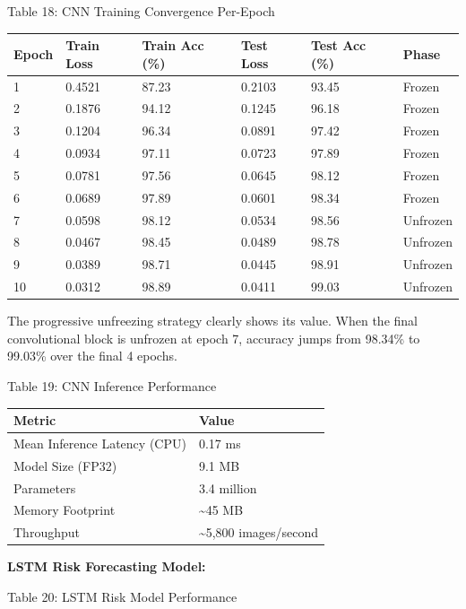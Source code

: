 \documentclass[12pt, a4paper]{report}
\begin{document}
Table 18: CNN Training Convergence Per-Epoch

\begin{table}[htbp]
\centering
\small
\begin{tabularx}{\textwidth}{|X|X|X|X|X|X|}
\hline
Epoch & Train Loss & Train Acc (\%) & Test Loss & Test Acc (\%) & Phase \\
\hline
1 & 0.4521 & 87.23 & 0.2103 & 93.45 & Frozen \\
2 & 0.1876 & 94.12 & 0.1245 & 96.18 & Frozen \\
3 & 0.1204 & 96.34 & 0.0891 & 97.42 & Frozen \\
4 & 0.0934 & 97.11 & 0.0723 & 97.89 & Frozen \\
5 & 0.0781 & 97.56 & 0.0645 & 98.12 & Frozen \\
6 & 0.0689 & 97.89 & 0.0601 & 98.34 & Frozen \\
7 & 0.0598 & 98.12 & 0.0534 & 98.56 & Unfrozen \\
8 & 0.0467 & 98.45 & 0.0489 & 98.78 & Unfrozen \\
9 & 0.0389 & 98.71 & 0.0445 & 98.91 & Unfrozen \\
10 & 0.0312 & 98.89 & 0.0411 & 99.03 & Unfrozen \\
\hline
\end{tabularx}
\end{table}

The progressive unfreezing strategy clearly shows its value. When the final convolutional block is unfrozen at epoch 7, accuracy jumps from 98.34\% to 99.03\% over the final 4 epochs.

Table 19: CNN Inference Performance

\begin{table}[htbp]
\centering
\small
\begin{tabularx}{\textwidth}{|X|X|}
\hline
Metric & Value \\
\hline
Mean Inference Latency (CPU) & 0.17 ms \\
Model Size (FP32) & 9.1 MB \\
Parameters & 3.4 million \\
Memory Footprint & \textasciitilde{}45 MB \\
Throughput & \textasciitilde{}5,800 images/second \\
\hline
\end{tabularx}
\end{table}

\textbf{LSTM Risk Forecasting Model:}

Table 20: LSTM Risk Model Performance
\end{document}
